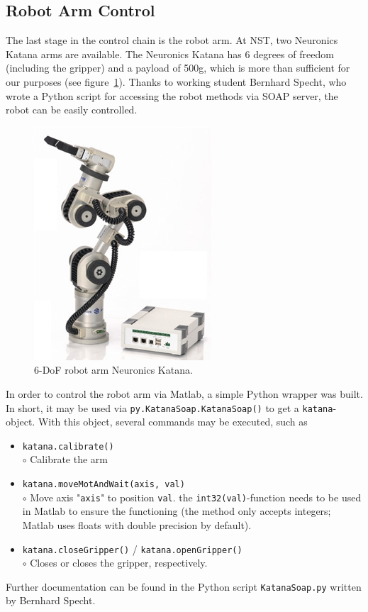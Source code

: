 \documentclass[a4paper,oneside, openright,12pt]{report}
\begin{document}
\subsection{Robot Arm Control}
The last stage in the control chain is the robot arm. At NST, two Neuronics Katana arms are available. The Neuronics Katana has 6 degrees of freedom (including the gripper) and a payload of 500g, which is more than sufficient for our purposes (see figure~\ref{fig:katana}). Thanks to working student Bernhard Specht, who wrote a Python script for accessing the robot methods via SOAP server, the robot can be easily controlled. 
\begin{figure}[htpb!]
	\centering
	\includegraphics[width=0.3\linewidth]{./gfx/katana.jpg}
	\caption{6-DoF robot arm Neuronics Katana.}
	\label{fig:katana}
\end{figure}
In order to control the robot arm via Matlab, a simple Python wrapper was built. In short, it may be used via \texttt{py.KatanaSoap.KatanaSoap()} to get a \texttt{katana}-object. With this object, several commands may be executed, such as
\begin{itemize}
	\item \texttt{katana.calibrate()}\\
	$\circ$ Calibrate the arm
	\item \texttt{katana.moveMotAndWait(axis, val)}\\
	$\circ$ Move axis "\texttt{axis}" to position \texttt{val}. the \texttt{int32(val)}-function needs to be used in Matlab to ensure the functioning (the method only accepts integers; Matlab uses floats with double precision by default).
	\item \texttt{katana.closeGripper()} / \texttt{katana.openGripper()}\\
	$\circ$ Closes or closes the gripper, respectively. 
\end{itemize}
Further documentation can be found in the Python script \texttt{KatanaSoap.py} written by Bernhard Specht.\\\\
\end{document}
